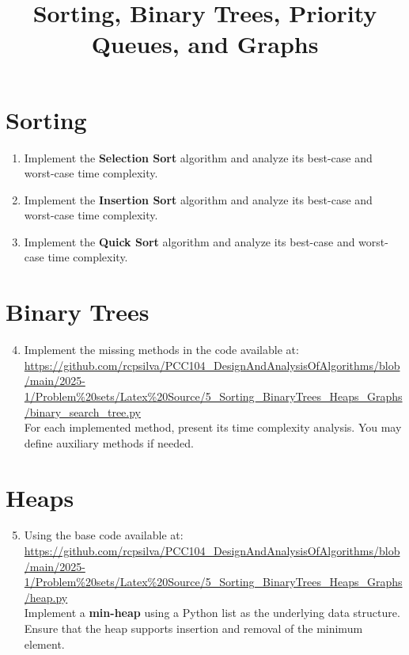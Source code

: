 \documentclass{article}
\title{Sorting, Binary Trees, Priority Queues, and Graphs}
\author{}
\date{}
\begin{document}
\maketitle

\section*{Sorting}

\begin{enumerate}
    \item Implement the \textbf{Selection Sort} algorithm and analyze its best-case and worst-case time complexity.
    \item Implement the \textbf{Insertion Sort} algorithm and analyze its best-case and worst-case time complexity.
    \item Implement the \textbf{Quick Sort} algorithm and analyze its best-case and worst-case time complexity.
\end{enumerate}

\section*{Binary Trees}

\begin{enumerate}
    \setcounter{enumi}{3}
    \item Implement the missing methods in the code available at:\\
    \url{https://github.com/rcpsilva/PCC104_DesignAndAnalysisOfAlgorithms/blob/main/2025-1/Problem%20sets/Latex%20Source/5_Sorting_BinaryTrees_Heaps_Graphs/binary_search_tree.py}\\
    For each implemented method, present its time complexity analysis. You may define auxiliary methods if needed.
\end{enumerate}

\section*{Heaps}

\begin{enumerate}
    \setcounter{enumi}{4}
    \item Using the base code available at: \\
    \url{https://github.com/rcpsilva/PCC104_DesignAndAnalysisOfAlgorithms/blob/main/2025-1/Problem%20sets/Latex%20Source/5_Sorting_BinaryTrees_Heaps_Graphs/heap.py}\\
    Implement a \textbf{min-heap} using a Python list as the underlying data structure. Ensure that the heap supports insertion and removal of the minimum element.
\end{enumerate}
\end{document}
